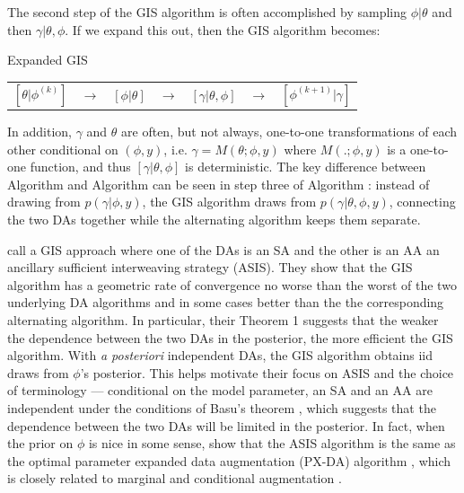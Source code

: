 \documentclass[12pt]{article}
\begin{document}
The second step of the GIS algorithm is often accomplished by sampling $\phi|\theta$ and then $\gamma|\theta,\phi$. If we expand this out, then the GIS algorithm becomes:
\begin{alg*}[eGIS]Expanded GIS\label{alg:eGIS}
  \begin{center}
    \begin{tabular}{lllllll}
      $[\theta|\phi^{(k)}]$& $\to$& $[\phi|\theta]$& $\to $&$[\gamma|\theta,\phi]$& $\to$& $[\phi^{(k+1)}|\gamma]$
    \end{tabular}
  \end{center}
\end{alg*}
\noindent
In addition, $\gamma$ and $\theta$ are often, but not always, one-to-one transformations of each other conditional on $(\phi,y)$, i.e. $\gamma = M(\theta;\phi,y)$ where $M(.;\phi,y)$ is a one-to-one function, and thus $[\gamma|\theta,\phi]$ is deterministic.
The key difference between Algorithm  and Algorithm  can be seen in step three of Algorithm : instead of drawing from $p(\gamma|\phi,y)$, the GIS algorithm draws from $p(\gamma|\theta,\phi,y)$, connecting the two DAs together while the alternating algorithm keeps them separate.

\citet{yu2011center} call a GIS approach where one of the DAs is an SA and the other is an AA an ancillary sufficient interweaving strategy (ASIS). They show that the GIS algorithm has a geometric rate of convergence no worse than the worst of the two underlying DA algorithms and in some cases better than the the corresponding alternating algorithm. In particular, their Theorem 1 suggests that the weaker the dependence between the two DAs in the posterior, the more efficient the GIS algorithm. With \emph{a posteriori} independent DAs, the GIS algorithm obtains iid draws from $\phi$'s posterior. This helps motivate their focus on ASIS and the choice of terminology --- conditional on the model parameter, an SA and an AA are independent under the conditions of Basu's theorem \citep{basu1955statistics}, which suggests that the dependence between the two DAs will be limited in the posterior. In fact, when the prior on $\phi$ is nice in some sense, \citet{yu2011center} show that the ASIS algorithm is the same as the optimal parameter expanded data augmentation (PX-DA) algorithm \citep{liu1999parameter}, which is closely related to marginal and conditional augmentation \citep{meng1999seeking,hobert2008theoretical}.
\end{document}
